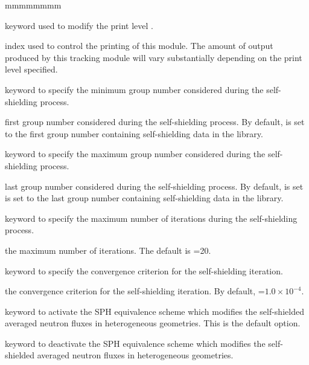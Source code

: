 \begin{ListeDeDescription}{mmmmmmmm}

\item[\moc{EDIT}] keyword used to modify the print level .

\item[\dusa{iprint}] index used to control the printing of this module. The
amount of output produced by this tracking module will vary substantially
depending on the print level specified. 

\item[\moc{GRMIN}] keyword to specify the minimum group number considered
during the self-shielding process.

\item[\dusa{lgrmin}] first group number considered during the
self-shielding process. By default,  is set to the first group
number containing self-shielding data in the library.

\item[\moc{GRMAX}]  keyword to specify the maximum group number considered
during the self-shielding process.

\item[\dusa{lgrmax}] last group number considered during the self-shielding
process. By default,  is set is set to the last group
number containing self-shielding data in the library.

\item[\moc{MXIT}]  keyword to specify the maximum number of iterations during
the self-shielding process.

\item[\dusa{imxit}] the maximum number of iterations. The default is
=20.

\item[\moc{EPS}] keyword to specify the convergence criterion for the
self-shielding iteration.

\item[\dusa{valeps}] the convergence criterion for the self-shielding iteration.
By default, =$1.0\times 10^{-4}$.

\item[\moc{SPH}] keyword to activate the SPH equivalence scheme which
modifies the self-shielded averaged neutron fluxes in
heterogeneous geometries. This is the default option.

\item[\moc{NOSP}] keyword to deactivate the SPH equivalence scheme which
modifies the self-shielded averaged neutron fluxes in
heterogeneous geometries.


\end{ListeDeDescription}
